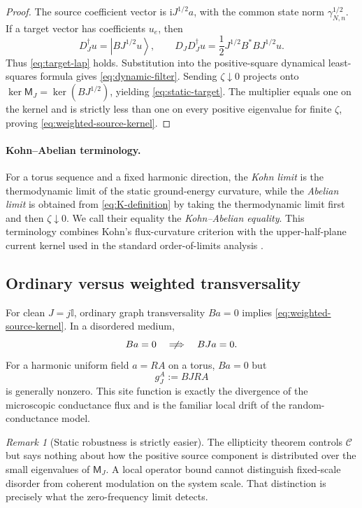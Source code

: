 \documentclass[11pt]{article}
\theoremstyle{definition}
\theoremstyle{remark}
\newtheorem{remark}[theorem]{Remark}
\newcommand{\ket}[1]{\left|#1\right\rangle}
\newcommand{\I}{\mathrm i}
\newcommand{\Id}{\mathbb I}
\newcommand{\cC}{\mathcal C}
\begin{document}
\begin{proof}
The source coefficient vector is $\I J^{1/2}a$, with the common state norm $\gamma_{N,n}^{1/2}$.  If a target vector has coefficients $u_e$, then
\[
 D_J^\dagger u=\ket{BJ^{1/2}u},
 \qquad
 D_JD_J^\dagger u=\frac12J^{1/2}B^*BJ^{1/2}u.
\]
Thus \eqref{eq:target-lap} holds.  Substitution into the positive-square dynamical least-squares formula gives \eqref{eq:dynamic-filter}.  Sending $\zeta\downarrow0$ projects onto $\ker\mathsf M_J=\ker(BJ^{1/2})$, yielding \eqref{eq:static-target}.  The multiplier equals one on the kernel and is strictly less than one on every positive eigenvalue for finite $\zeta$, proving \eqref{eq:weighted-source-kernel}.
\end{proof}


\paragraph{Kohn--Abelian terminology.}
For a torus sequence and a fixed harmonic direction, the \emph{Kohn limit} is the thermodynamic limit of the static ground-energy curvature, while the \emph{Abelian limit} is obtained from \eqref{eq:K-definition} by taking the thermodynamic limit first and then $\zeta\downarrow0$.  We call their equality the \emph{Kohn--Abelian equality}.  This terminology combines Kohn's flux-curvature criterion with the upper-half-plane current kernel used in the standard order-of-limits analysis \cite{Kohn1964,ScalapinoWhiteZhang1993}.

\subsection{Ordinary versus weighted transversality}

For clean $J=j\Id$, ordinary graph transversality $Ba=0$ implies \eqref{eq:weighted-source-kernel}.  In a disordered medium,
\begin{equation}
 Ba=0\quad\centernot\Longrightarrow\quad BJa=0.
\end{equation}
For a harmonic uniform field $a=RA$ on a torus, $Ba=0$ but
\begin{equation}
 g_J^A:=BJRA
 \label{eq:drift}
\end{equation}
is generally nonzero.  This site function is exactly the divergence of the microscopic conductance flux and is the familiar local drift of the random-conductance model.

\begin{remark}[Static robustness is strictly easier]
The ellipticity theorem controls $\cC$ but says nothing about how the positive source component is distributed over the small eigenvalues of $\mathsf M_J$.  A local operator bound cannot distinguish fixed-scale disorder from coherent modulation on the system scale.  That distinction is precisely what the zero-frequency limit detects.
\end{remark}
\end{document}
